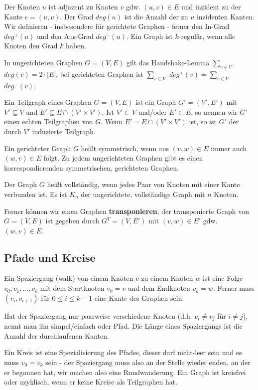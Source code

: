 \documentclass[12pt]{article}
\begin{document}
Der Knoten $u$ ist adjazent zu Knoten $v$ gdw. $(u,v) \in E$ und inzident zu der Kante $e = (u,v)$. Der Grad $deg(u)$ ist die Anzahl der zu $u$ inzidenten Kanten. Wir definieren - insbesondere für gerichtete Graphen - ferner den In-Grad $deg^+(u)$ und den Aus-Grad $deg^-(u)$. Ein Graph ist $k$-regulär, wenn alle Knoten den Grad $k$ haben.

In ungerichteten Graphen $G = (V, E)$ gilt das Handshake-Lemma $\sum_{v \in V}$ $deg(v) = 2\cdot{}|E|$, bei gerichteten Graphen ist $\sum_{v \in V}$ $deg^+(v) = \sum_{v \in V}$ $deg^-(v)$.

Ein Teilgraph eines Graphen $G = (V, E)$ ist ein Graph $G' = (V', E')$ mit $V' \subseteq V$ und $E' \subseteq E \cap (V' \times V')$. Ist $V' \subset V$ und/oder $E' \subset E$, so nennen wir $G'$ einen echten Teilgraphen von $G$. Wenn $E' = E \cap (V' \times V')$ ist, so ist $G'$ der durch $V'$ induzierte Teilgraph.

Ein gerichteter Graph $G$ heißt symmetrisch, wenn aus $(v,w) \in E$ immer auch $(w,v) \in E$ folgt. Zu jedem ungerichteten Graphen gibt es einen korrespondierenden symmetrischen, gerichteten Graphen.

Der Graph $G$ heißt vollständig, wenn jedes Paar von Knoten mit einer Kante verbunden ist. Es ist $K_n$ der ungerichtete, vollständige Graph mit $n$ Knoten.

Ferner können wir einen Graphen \textbf{transponieren}, der transponierte Graph von $G = (V, E)$ ist gegeben durch $G^T = (V, E')$ mit $(v, w) \in E'$ gdw. $(w, v) \in E$.

\subsection{Pfade und Kreise}

Ein Spaziergang (walk) von einem Knoten $v$ zu einem Knoten $w$ ist eine Folge $v_0, v_1, ..., v_k$ mit dem Startknoten $v_0 = v$ und dem Endknoten $v_k = w$. Ferner muss $(v_i, v_{i+1})$ für $0 \leq i \leq k-1$ eine Kante des Graphen sein.

Hat der Spaziergang nur paarweise verschiedene Knoten (d.h. $v_i \neq v_j$ für $i \neq j$), nennt man ihn simpel/einfach oder Pfad. Die Länge eines Spaziergangs ist die Anzahl der durchlaufenen Kanten.

Ein Kreis ist eine Spezialisierung des Pfades, dieser darf nicht-leer sein und es muss $v_0 = v_k$ sein - der Spaziergang muss also an der Stelle wieder enden, an der er begonnen hat, wir machen also eine Rundwanderung. Ein Graph ist kreisfrei oder azyklisch, wenn er keine Kreise als Teilgraphen hat.
\end{document}
